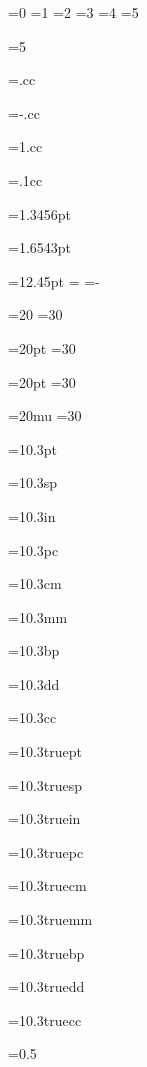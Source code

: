 =0
=1
=2
=3
=4
=5

=5
\showthe{}

=.cc
\showthe{}

=-.cc
\showthe{}

=1.cc
\showthe{}

=.1cc
\showthe{}

=1.3456pt
\showthe{}

=1.6543pt
\showthe{}

=12.45pt
\showthe{}
=
\showthe{}
=-
\showthe{}

=20
=30
\showthe{}

=20pt
=30
\showthe{}

=20pt
=30
\showthe{}

=20mu
=30
\showthe{}

=10.3pt
\showthe{}

=10.3sp
\showthe{}

=10.3in
\showthe{}

=10.3pc
\showthe{}

=10.3cm
\showthe{}

=10.3mm
\showthe{}

=10.3bp
\showthe{}

=10.3dd
\showthe{}

=10.3cc
\showthe{}


=10.3truept
\showthe{}

=10.3truesp
\showthe{}

=10.3truein
\showthe{}

=10.3truepc
\showthe{}

=10.3truecm
\showthe{}

=10.3truemm
\showthe{}

=10.3truebp
\showthe{}

=10.3truedd
\showthe{}

=10.3truecc
\showthe{}

=0.5
\showthe{}

